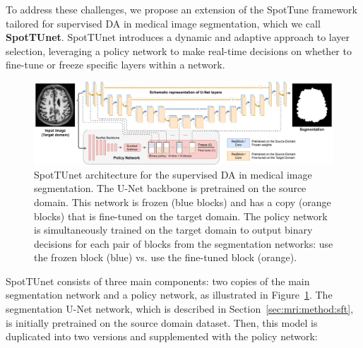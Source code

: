 To address these challenges, we propose an extension of the SpotTune framework \cite{guo2019spottune} tailored for supervised DA in medical image segmentation, which we call \textbf{SpotTUnet}. SpotTUnet introduces a dynamic and adaptive approach to layer selection, leveraging a policy network to make real-time decisions on whether to fine-tune or freeze specific layers within a network.

\begin{figure}[!h]
	\centering
	\includegraphics[width=\textwidth]{Dissertation/Figures/2_mri/spottune_seg.pdf}
	\caption{SpotTUnet architecture for the supervised DA in medical image segmentation. The U-Net backbone is pretrained on the source domain. This network is frozen (blue blocks) and has a copy (orange blocks) that is fine-tuned on the target domain. The policy network is simultaneously trained on the target domain to output binary decisions for each pair of blocks from the segmentation networks: use the frozen block (blue) vs. use the fine-tuned block (orange).}
	\label{fig:spottune_seg}
\end{figure}

SpotTUnet consists of three main components: two copies of the main segmentation network and a policy network, as illustrated in Figure~\ref{fig:spottune_seg}. The segmentation  U-Net network, which is described in Section~\ref{sec:mri:method:sft}, is initially pretrained on the source domain dataset. Then, this model is duplicated into two versions and supplemented with the policy network:

